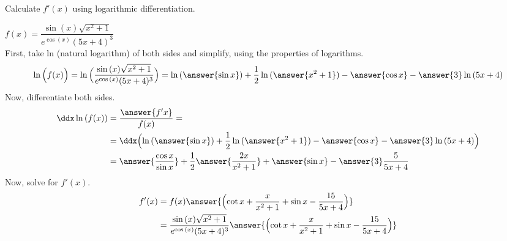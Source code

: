 \documentclass{ximera}
\author{Nela Lakos \and Kyle Parsons}
\begin{document}
\begin{exercise}

Calculate $f'(x)$ using logarithmic differentiation. 

 $f(x)=\dfrac{\sin{(x)}\sqrt{x^2+1}}{e^{\cos{(x)}}(5x+4)^3}$\\

First, take ln (natural logarithm) of both sides and simplify, using the properties of logarithms.
\begin{align*}
\ln{\Bigl(f(x)\Bigr)}=\ln{\Bigl(\dfrac{\sin{(x)}\sqrt{x^2+1}}{e^{\cos{(x)}}(5x+4)^3}\Bigr)} &=\ln{(\answer{\sin{x}})}+\dfrac{1}{2}\ln{(\answer{x^2+1})}-\answer{\cos{x}}-\answer{3}\ln{(5x+4)} \\
\end{align*}
Now, differentiate both sides.
\begin{align*}
\ddx \ln{(f(x))} &= \dfrac{\answer{f'{x}}}{f(x)}=\\
&=\ddx\Bigl(\ln{(\answer{\sin{x}})}+\dfrac{1}{2}\ln{(\answer{x^2+1})}-\answer{\cos{x}}-\answer{3}\ln{(5x+4)} \Bigr)\\
 &=\answer{\dfrac{\cos{x}}{\sin{x}}}+\dfrac{1}{2}\answer{\dfrac{2x}{x^2+1}}+\answer{\sin{x}}-\answer{3}\dfrac{5}{5x+4}
\end{align*}
Now, solve for $f'(x)$.
\begin{align*}
f'(x)&=f(x)\answer{\Bigl(\cot{x}+\dfrac{x}{x^2+1}+\sin{x}-\dfrac{15}{5x+4}\Bigr)}\\
&=\dfrac{\sin{(x)}\sqrt{x^2+1}}{e^{\cos{(x)}}(5x+4)^3}\answer{\Bigl(\cot{x}+\dfrac{x}{x^2+1}+\sin{x}-\dfrac{15}{5x+4}\Bigr)}
\end{align*}
\end{exercise}
\end{document}
